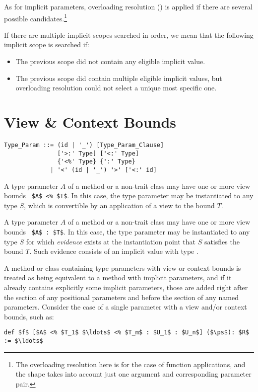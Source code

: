 As for implicit parameters, overloading resolution () is applied if there are several possible candidates.\footnote{The overloading resolution here is for the case of function applications, and the shape takes into account just one argument and corresponding parameter pair.}

If there are multiple implicit scopes searched in order, we mean that the following implicit scope is searched if:
\begin{itemize}
  \item The previous scope did not contain any eligible implicit value.
  \item The previous scope did contain multiple eligible implicit values, but overloading resolution could not select a unique most specific one. 
\end{itemize}





\section{View \& Context Bounds}
\label{sec:view-bounds}
\label{sec:context-bounds}

\syntax\begin{lstlisting}
Type_Param ::= (id | '_') [Type_Param_Clause]
               ['>:' Type] ['<:' Type]
               {'<%' Type} {':' Type}
             | '<' (id | '_') '>' ['<:' id]
\end{lstlisting}

A type parameter $A$ of a method or a non-trait class may have one or more view bounds ~\lstinline!$A$ <% $T$!. In this case, the type parameter may be instantiated to any type $S$, which is convertible by an application of a view to the bound $T$.

A type parameter $A$ of a method or a non-trait class may have one or more view bounds ~\lstinline!$A$ : $T$!. In this case, the type parameter may be instantiated to any type $S$ for which {\em evidence} exists at the instantiation point that $S$ satisfies the bound $T$. Such evidence consists of an implicit value with type . 

A method or class containing type parameters with view or context bounds is treated as being equivalent to a method with implicit parameters, and if it already contains explicitly some implicit parameters, those are added right after the section of any positional parameters and before the section of any named parameters. Consider the case of a single parameter with a view and/or context bounds, such as: 
\begin{lstlisting}
def $f$ [$A$ <% $T_1$ $\ldots$ <% $T_m$ : $U_1$ : $U_n$] ($\ps$): $R$ := $\ldots$
\end{lstlisting}

